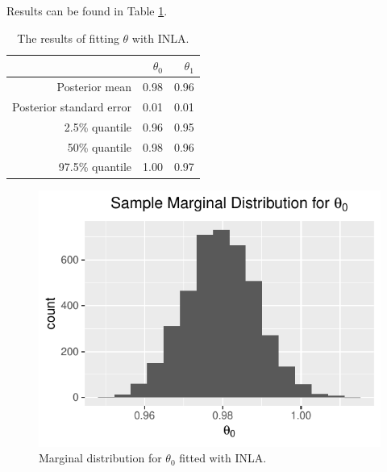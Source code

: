 \documentclass[letterpaper,11pt]{article}
\begin{document}
\begin{enumerate}
\begin{enumerate}
\begin{description}
      Results can be found in Table \ref{tab:p3_theta}.

      \begin{table}[ht]
        \centering
        \begin{tabular}{rrr}
          \hline
          & $\theta_0$ & $\theta_1$ \\ 
          \hline
          Posterior mean & 0.98 & 0.96 \\ 
          Posterior standard error & 0.01 & 0.01 \\ 
          2.5\% quantile & 0.96 & 0.95 \\ 
          50\% quantile & 0.98 & 0.96 \\ 
          97.5\% quantile & 1.00 & 0.97 \\ 
          \hline
        \end{tabular}
        \caption{The results of fitting $\theta$ with INLA.}
        \label{tab:p3_theta}
      \end{table}

      \begin{figure}
        \centering
        \includegraphics{p3_theta_0.pdf}
        \caption{Marginal distribution for $\theta_0$ fitted with INLA.}
        \label{fig:p3_theta_0}
      \end{figure}


\end{description}
\end{enumerate}
\end{enumerate}
\end{document}

